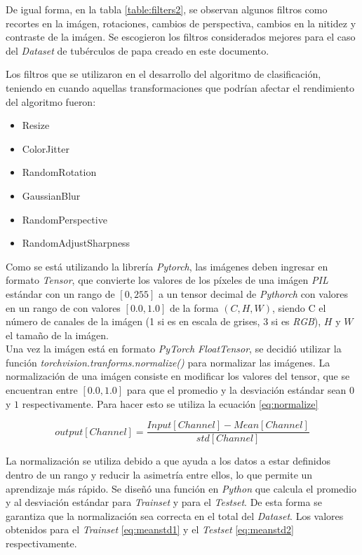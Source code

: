 			De igual forma, en la tabla \ref{table:filters2}, se observan algunos filtros como recortes en la imágen, rotaciones, cambios de perspectiva, cambios en la nitidez y contraste de la imágen. Se escogieron los filtros considerados mejores para el caso del \textit{Dataset} de tubérculos de papa creado en este documento. 
			
			
			
			\newpage
			Los filtros que se utilizaron en el desarrollo del algoritmo de clasificación, teniendo en cuando aquellas transformaciones que podrían afectar el rendimiento del algoritmo fueron:
			
			\begin{itemize}
				\item Resize
				\item ColorJitter
				\item RandomRotation
				\item GaussianBlur
				\item RandomPerspective
				\item RandomAdjustSharpness
			\end{itemize}

			Como se está utilizando la librería \textit{Pytorch}, las imágenes deben ingresar en formato \textit{Tensor}, que convierte los valores de los píxeles de una imágen \textit{PIL} estándar con un rango de $[0, 255]$  a un tensor decimal de \textit{Pythorch} con valores en un rango de con valores $[0.0, 1.0]$ de la forma  $(C, H, W)$, siendo C el número de canales de la imágen (1 si es en escala de grises, 3 si es \textit{RGB}), $H$ y $W$ el tamaño de la imágen. \\
			
			Una vez la imágen está en formato \textit{PyTorch FloatTensor}, se decidió utilizar la función \textit{torchvision.tranforms.normalize()} para normalizar las imágenes. La normalización de una imágen consiste en modificar los valores del tensor, que se encuentran entre $[0.0, 1.0]$ para que el promedio y la desviación estándar sean $0$ y $1$ respectivamente. Para hacer esto se utiliza la ecuación \ref{eq:normalize} \cite{Pytorch}
			
			\begin{equation}
				{output[Channel]=\frac{Input[Channel]-Mean[Channel]}{std[Channel]}}
				\label{eq:normalize}
			\end{equation}

			La normalización se utiliza debido a que ayuda a los datos a estar definidos dentro de un rango y reducir la asimetría entre ellos, lo que permite un aprendizaje más rápido. Se diseñó una función en \textit{Python} que calcula el promedio y al desviación estándar para \textit{Trainset} y para el \textit{Testset}. De esta forma se garantiza que la normalización sea correcta en el total del \textit{Dataset}. Los valores obtenidos para el \textit{Trainset} \ref{eq:meanstd1} y el \textit{Testset} \ref{eq:meanstd2} respectivamente.
			
